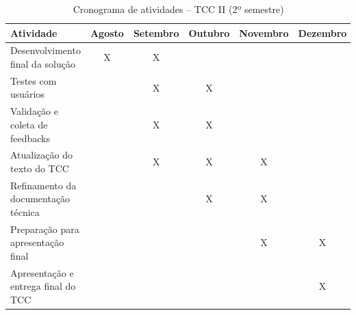 \begin{table}[H]
\centering
\caption{Cronograma de atividades – TCC II (2º semestre)}
\label{tab:cronograma_tcc2}
\begin{tabular}{|p{5cm}|c|c|c|c|c|}
\hline
\textbf{Atividade} & \textbf{Agosto} & \textbf{Setembro} & \textbf{Outubro} & \textbf{Novembro} & \textbf{Dezembro} \\
\hline
Desenvolvimento final da solução      & X & X &   &   &   \\
Testes com usuários                   &   & X & X &   &   \\
Validação e coleta de feedbacks       &   & X & X &   &   \\
Atualização do texto do TCC           &   & X & X & X &   \\
Refinamento da documentação técnica   &   &   & X & X &   \\
Preparação para apresentação final    &   &   &   & X & X \\
Apresentação e entrega final do TCC   &   &   &   &   & X \\
\hline
\end{tabular}
\end{table}

